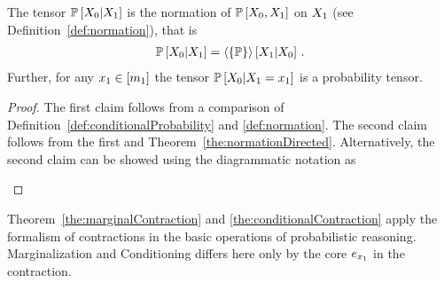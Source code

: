 
\begin{theorem}\label{the:conditionalContraction}
	The tensor $\mathbb{P}\left[X_{0}|X_{1}\right]$ is the normation of $\mathbb{P}\left[X_{0},X_{1}\right]$ on $X_{1}$  (see Definition~\ref{def:normation}), that is
	\begin{align*}
		\mathbb{P}\left[X_{0}|X_{1}\right]   
		= \left\langle \{\mathbb{P}\}\right\rangle \left[ X_{1} | X_{0} \right] \, . 
	\end{align*}
	Further, for any $x_{1}\in[m_{1}]$ the tensor $\mathbb{P}\left[X_{0}|X_{1}=x_{1}\right]$ is a probability tensor.
\end{theorem}
%	
\begin{proof}
	The first claim follows from a comparison of Definition~\ref{def:conditionalProbability} and \ref{def:normation}.
	The second claim follows from the first and Theorem~\ref{the:normationDirected}.
	Alternatively, the second claim can be showed using the diagrammatic notation as
	\begin{center}
		
	\end{center}
\end{proof}



Theorem~\ref{the:marginalContraction} and \ref{the:conditionalContraction} apply the formalism of contractions in the basic operations of probabilistic reasoning.
Marginalization and Conditioning differs here only by the core $e_{x_{1}}$ in the contraction.


